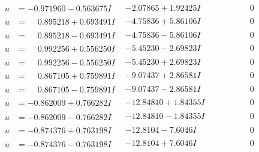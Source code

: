 \documentclass[1p]{elsarticle_modified}
\theoremstyle{definition}
\begin{document}
$$\begin{array}{c|c|c}
\begin{aligned}
u &= -0.971960 - 0.563675 I\end{aligned}
 & -2.07865 + 1.92425 I & \phantom{-0.000000 } 0 \\ \hline\begin{aligned}
u &= \phantom{-}0.895218 + 0.693491 I\end{aligned}
 & -4.75836 + 5.86106 I & \phantom{-0.000000 } 0 \\ \hline\begin{aligned}
u &= \phantom{-}0.895218 - 0.693491 I\end{aligned}
 & -4.75836 - 5.86106 I & \phantom{-0.000000 } 0 \\ \hline\begin{aligned}
u &= \phantom{-}0.992256 + 0.556250 I\end{aligned}
 & -5.45230 - 2.69823 I & \phantom{-0.000000 } 0 \\ \hline\begin{aligned}
u &= \phantom{-}0.992256 - 0.556250 I\end{aligned}
 & -5.45230 + 2.69823 I & \phantom{-0.000000 } 0 \\ \hline\begin{aligned}
u &= \phantom{-}0.867105 + 0.759891 I\end{aligned}
 & -9.07437 + 2.86581 I & \phantom{-0.000000 } 0 \\ \hline\begin{aligned}
u &= \phantom{-}0.867105 - 0.759891 I\end{aligned}
 & -9.07437 - 2.86581 I & \phantom{-0.000000 } 0 \\ \hline\begin{aligned}
u &= -0.862009 + 0.766282 I\end{aligned}
 & -12.84810 + 1.84355 I & \phantom{-0.000000 } 0 \\ \hline\begin{aligned}
u &= -0.862009 - 0.766282 I\end{aligned}
 & -12.84810 - 1.84355 I & \phantom{-0.000000 } 0 \\ \hline\begin{aligned}
u &= -0.874376 + 0.763198 I\end{aligned}
 & -12.8104 - 7.6046 I & \phantom{-0.000000 } 0 \\ \hline\begin{aligned}
u &= -0.874376 - 0.763198 I\end{aligned}
 & -12.8104 + 7.6046 I & \phantom{-0.000000 } 0 \\ \hline\begin{aligned}

\end{aligned}
\end{array}$$
\end{document}
